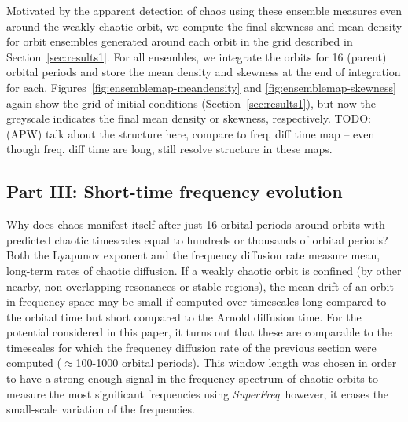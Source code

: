 \documentclass[letterpaper,12pt,preprint]{aastex}
\newcommand{\project}[1]{\textsl{#1}}
\newcommand{\superfreq}{\project{SuperFreq}}
\newcommand{\todo}[2]{{\color{red} TODO: (\MakeUppercase{#1}) #2}}
\begin{document}
Motivated by the apparent detection of chaos using these ensemble measures even around the weakly chaotic orbit, we compute the final skewness and mean density for orbit ensembles generated around each orbit in the grid described in Section~\ref{sec:results1}. For all ensembles, we integrate the orbits for 16 (parent) orbital periods and store the mean density and skewness at the end of integration for each. Figures~\ref{fig:ensemblemap-meandensity} and \ref{fig:ensemblemap-skewness} again show the grid of initial conditions (Section~\ref{sec:results1}), but now the greyscale indicates the final mean density or skewness, respectively. \todo{apw}{talk about the structure here, compare to freq. diff time map -- even though freq. diff time are long, still resolve structure in these maps.}

\subsection{Part III: Short-time frequency evolution}\label{sec:results3}

Why does chaos manifest itself after just 16 orbital periods around orbits with predicted chaotic timescales equal to hundreds or thousands of orbital periods? Both the Lyapunov exponent and the frequency diffusion rate measure mean, long-term rates of chaotic diffusion. If a weakly chaotic orbit is confined (by other nearby, non-overlapping resonances or stable regions), the mean drift of an orbit in frequency space may be small if computed over timescales long compared to the orbital time but short compared to the Arnold diffusion time. For the potential considered in this paper, it turns out that these are comparable to the timescales for which the frequency diffusion rate of the previous section were computed ($\approx$100-1000 orbital periods). This window length was chosen in order to have a strong enough signal in the frequency spectrum of chaotic orbits to measure the most significant frequencies using \superfreq\, however, it erases the small-scale variation of the frequencies. 
\end{document}

